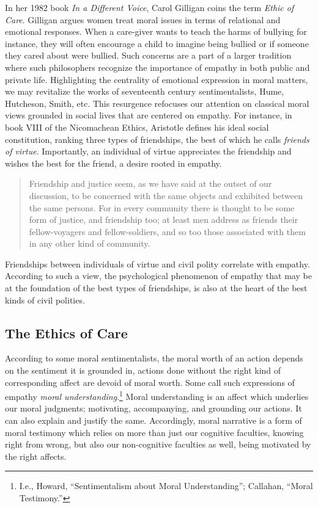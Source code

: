 \documentclass[phdthesis,12pt,final,a4paper]{wuthesis}
\theoremstyle{definition}
\theoremstyle{definition}
\theoremstyle{definition}
\theoremstyle{definition}
\theoremstyle{remark}
\begin{document}
In her 1982 book \emph{In a Different Voice}, Carol Gilligan coins the term \emph{Ethic of Care}. Gilligan argues women treat moral issues in terms of relational and emotional responses. When a care-giver wants to teach the harms of bullying for instance, they will often encourage a child to imagine being bullied or if someone they cared about were bullied. Such concerns are a part of a larger tradition where such philosophers recognize the importance of empathy in both public and private life. Highlighting the centrality of emotional expression in moral matters, we may revitalize the works of seventeenth century sentimentalists, Hume, Hutcheson, Smith, etc. This resurgence refocuses our attention on classical moral views grounded in social lives that are centered on empathy. For instance, in book VIII of the Nicomachean Ethics, Aristotle defines his ideal social constitution, ranking three types of friendships, the best of which he calls \emph{friends of virtue}. Importantly, an individual of virtue appreciates the friendship and wishes the best for the friend, a desire rooted in empathy.

\begin{quote}
Friendship and justice seem, as we have said at the outset of our discussion, to be concerned with the same objects and exhibited between the same persons. For in every community there is thought to be some form of justice, and friendship too; at least men address as friends their fellow-voyagers and fellow-soldiers, and so too those associated with them in any other kind of community.
\end{quote}

Friendships between individuals of virtue and civil polity correlate with empathy. According to such a view, the psychological phenomenon of empathy that may be at the foundation of the best types of friendships, is also at the heart of the best kinds of civil polities.

\subsection*{The Ethics of Care}\label{the-ethics-of-care}

According to some moral sentimentalists, the moral worth of an action depends on the sentiment it is grounded in, actions done without the right kind of corresponding affect are devoid of moral worth. Some call such expressions of empathy \emph{moral understanding}.\footnote{I.e., Howard, {``Sentimentalism about {Moral Understanding}''}; Callahan, {``Moral {Testimony}.''}} Moral understanding is an affect which underlies our moral judgments; motivating, accompanying, and grounding our actions. It can also explain and justify the same. Accordingly, moral narrative is a form of moral testimony which relies on more than just our cognitive faculties, knowing right from wrong, but also our non-cognitive faculties as well, being motivated by the right affects.
\end{document}
